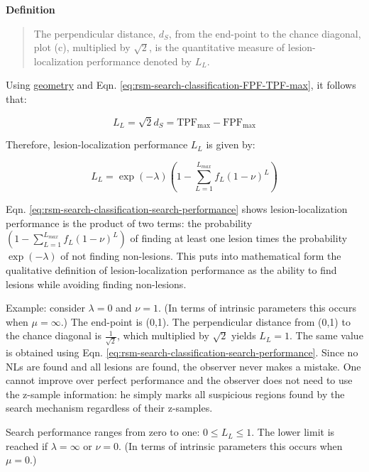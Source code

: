 \documentclass[
]{book}
\begin{document}
\textbf{Definition}

\begin{quote}
The perpendicular distance, \(d_S\), from the end-point to the chance diagonal, plot (c), multiplied by \(\sqrt{2}\), is the quantitative measure of lesion-localization performance denoted by \(L_L\).
\end{quote}

Using \href{https://en.wikipedia.org/wiki/Distance_from_a_point_to_a_line\#Line_defined_by_an_equation}{geometry} and Eqn. \eqref{eq:rsm-search-classification-FPF-TPF-max}, it follows that:

\begin{equation} 
L_L=\sqrt{2}d_S=\text{TPF}_{\text{max}}-\text{FPF}_{\text{max}}
\label{eq:rsm-search-classification-perp-distance}
\end{equation}

Therefore, lesion-localization performance \(L_L\) is given by:

\begin{equation} 
L_L=\exp\left ( -\lambda \right )\left (1-\sum_{L=1}^{L_{max}}f_L\left ( 1-\nu  \right )^L  \right )
\label{eq:rsm-search-classification-search-performance}
\end{equation}

Eqn. \eqref{eq:rsm-search-classification-search-performance} shows lesion-localization performance is the product of two terms: the probability \(\left (1-\sum_{L=1}^{L_{max}}f_L\left ( 1-\nu \right )^L \right )\) of finding at least one lesion times the probability \(\exp\left ( -\lambda \right )\) of not finding non-lesions. This puts into mathematical form the qualitative definition of lesion-localization performance as the ability to find lesions while avoiding finding non-lesions.

Example: consider \(\lambda = 0\) and \(\nu = 1\). (In terms of intrinsic parameters this occurs when \(\mu = \infty\).) The end-point is (0,1). The perpendicular distance from (0,1) to the chance diagonal is \(\frac{1}{\sqrt{2}}\), which multiplied by \(\sqrt{2}\) yields \(L_L = 1\). The same value is obtained using Eqn. \eqref{eq:rsm-search-classification-search-performance}. Since no NLs are found and all lesions are found, the observer never makes a mistake. One cannot improve over perfect performance and the observer does not need to use the z-sample information: he simply marks all suspicious regions found by the search mechanism regardless of their z-samples.

Search performance ranges from zero to one: \(0 \le L_L \le 1\). The lower limit is reached if \(\lambda = \infty\) or \(\nu = 0\). (In terms of intrinsic parameters this occurs when \(\mu = 0\).)
\end{document}

